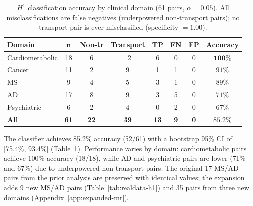 \documentclass[11pt]{article}
\begin{document}
\begin{table}[t]
\centering
\caption{$H^1$ classification accuracy by clinical domain (61 pairs, $\alpha = 0.05$). All misclassifications are false negatives (underpowered non-transport pairs); no transport pair is ever misclassified (specificity $= 1.00$).}
\label{tab:realdata-domain}
\small
\begin{tabular}{@{}lccccccc@{}}
\toprule
\textbf{Domain} & $\boldsymbol{n}$ & \textbf{Non-tr} & \textbf{Transport} & \textbf{TP} & \textbf{FN} & \textbf{FP} & \textbf{Accuracy} \\
\midrule
Cardiometabolic & 18 & 6 & 12 & 6 & 0 & 0 & $\mathbf{100\%}$ \\
Cancer & 11 & 2 & 9 & 1 & 1 & 0 & $91\%$ \\
MS & 9 & 4 & 5 & 3 & 1 & 0 & $89\%$ \\
AD & 17 & 8 & 9 & 3 & 5 & 0 & $71\%$ \\
Psychiatric & 6 & 2 & 4 & 0 & 2 & 0 & $67\%$ \\
\midrule
\textbf{All} & \textbf{61} & \textbf{22} & \textbf{39} & \textbf{13} & \textbf{9} & \textbf{0} & $\mathbf{85.2\%}$ \\
\bottomrule
\end{tabular}
\end{table}

The classifier achieves 85.2\% accuracy (52/61) with a bootstrap 95\% CI of [75.4\%, 93.4\%] (Table~\ref{tab:realdata-domain}). Performance varies by domain: cardiometabolic pairs achieve 100\% accuracy (18/18), while AD and psychiatric pairs are lower (71\% and 67\%) due to underpowered non-transport pairs. The original 17 MS/AD pairs from the prior analysis are preserved with identical values; the expansion adds 9 new MS/AD pairs (Table~\ref{tab:realdata-h1}) and 35 pairs from three new domains (Appendix~\ref{app:expanded-mr}).
\end{document}
